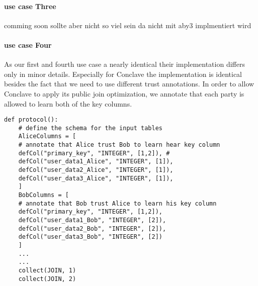 \paragraph{use case Three}
comming soon sollte aber nicht so viel sein da nicht mit aby3 implmentiert wird

\paragraph{use case Four}
As our first and fourth use case a nearly identical their implementation differs only in minor details. Especially for Conclave the implementation is identical besides the fact that we need to use different trust annotations. In order to allow Conclave to apply its public join optimization, we annotate that each party is allowed to learn both of the key columns.

\begin{lstlisting}[caption={ The Python protocol of Conclave for our last use case    }]
	def protocol():
	# define the schema for the input tables 
	AliceColumns = [
	# annotate that Alice trust Bob to learn hear key column
	defCol("primary_key", "INTEGER", [1,2]), #
	defCol("user_data1_Alice", "INTEGER", [1]),
	defCol("user_data2_Alice", "INTEGER", [1]),
	defCol("user_data3_Alice", "INTEGER", [1]),
	]
	BobColumns = [
	# annotate that Bob trust Alice to learn his key column
	defCol("primary_key", "INTEGER", [1,2]),
	defCol("user_data1_Bob", "INTEGER", [2]),
	defCol("user_data2_Bob", "INTEGER", [2]),
	defCol("user_data3_Bob", "INTEGER", [2])
	]
	...
	...
	collect(JOIN, 1)
	collect(JOIN, 2)
\end{lstlisting}



